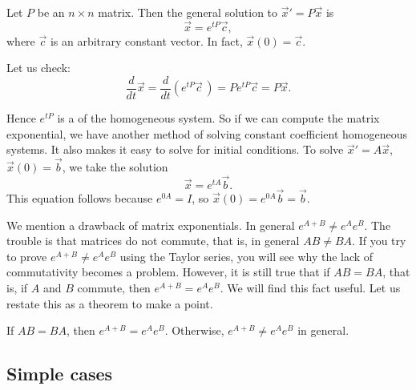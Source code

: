 \begin{theorem}
Let $P$ be an $n \times n$ matrix.  Then the general solution to
${\vec{x}}' = P \vec{x}$ is
\begin{equation*}
\vec{x} = e^{tP} \vec{c} ,
\end{equation*}
where $\vec{c}$ is an arbitrary constant vector.  In fact, $\vec{x}(0) =
\vec{c}$.
\end{theorem}

Let us check:
\begin{equation*}
\frac{d}{dt}
\vec{x} =
\frac{d}{dt} \left( 
e^{tP} \vec{c}\, \right)
=
P e^{tP} \vec{c} =
P \vec{x}.
\end{equation*}

Hence $e^{tP}$ is a 
of the homogeneous system.
So if we can compute the matrix exponential,
we have another method of solving constant coefficient homogeneous
systems.  It also makes it easy to solve for initial conditions.  To solve 
${\vec{x}}' = A \vec{x}$, $\vec{x}(0) = \vec{b}$, we take the solution
\begin{equation*}
\vec{x} = e^{tA} \vec{b} .
\end{equation*}
This equation follows because $e^{0A} = I$,
so $\vec{x} (0) = e^{0A} \vec{b} = \vec{b}$.

\medskip

We mention a drawback of matrix exponentials.
In general $e^{A+B} \not= e^A e^B$.  The trouble is that matrices do
not commute, that is, in general $AB \not= BA$.
If you try to prove $e^{A+B} \not= e^A e^B$ using the Taylor series,
you will see why the lack of commutativity becomes a problem.
However, it is still true that if
$AB = BA$, that is, if $A$ and $B$ commute, then $e^{A+B} = e^Ae^B$.  We will
find this fact useful.  Let us restate this as a theorem to make a point.

\begin{theorem}
If $AB = BA$, then $e^{A+B} = e^Ae^B$.  Otherwise,
$e^{A+B} \not= e^Ae^B$ in general.
\end{theorem}

\subsection{Simple cases}

